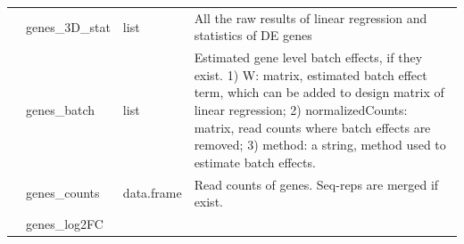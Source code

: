 \documentclass[]{article}
\begin{document}
\begin{longtable}[]{@{}llll@{}}
\begin{minipage}[t]{0.08\columnwidth}
\strut
\end{minipage} & \begin{minipage}[t]{0.06\columnwidth}\raggedright\strut
genes\_3D\_stat\strut
\end{minipage} & \begin{minipage}[t]{0.04\columnwidth}\raggedright\strut
list\strut
\end{minipage} & \begin{minipage}[t]{0.71\columnwidth}\raggedright\strut
All the raw results of linear regression and statistics of DE
genes\strut
\end{minipage}\tabularnewline
\begin{minipage}[t]{0.08\columnwidth}\raggedright\strut
\strut
\end{minipage} & \begin{minipage}[t]{0.06\columnwidth}\raggedright\strut
genes\_batch\strut
\end{minipage} & \begin{minipage}[t]{0.04\columnwidth}\raggedright\strut
list\strut
\end{minipage} & \begin{minipage}[t]{0.71\columnwidth}\raggedright\strut
Estimated gene level batch effects, if they exist. 1) W: matrix,
estimated batch effect term, which can be added to design matrix of
linear regression; 2) normalizedCounts: matrix, read counts where batch
effects are removed; 3) method: a string, method used to estimate batch
effects.\strut
\end{minipage}\tabularnewline
\begin{minipage}[t]{0.08\columnwidth}\raggedright\strut
\strut
\end{minipage} & \begin{minipage}[t]{0.06\columnwidth}\raggedright\strut
genes\_counts\strut
\end{minipage} & \begin{minipage}[t]{0.04\columnwidth}\raggedright\strut
data.frame\strut
\end{minipage} & \begin{minipage}[t]{0.71\columnwidth}\raggedright\strut
Read counts of genes. Seq-reps are merged if exist.\strut
\end{minipage}\tabularnewline
\begin{minipage}[t]{0.08\columnwidth}\raggedright\strut
\strut
\end{minipage} & \begin{minipage}[t]{0.06\columnwidth}\raggedright\strut
genes\_log2FC\strut

\end{minipage}
\end{longtable}
\end{document}
